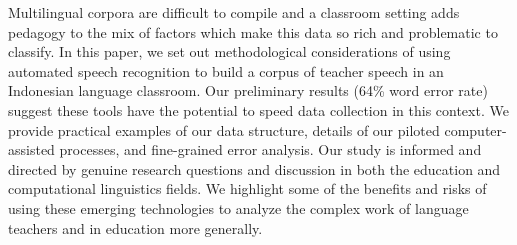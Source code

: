 Multilingual corpora are difficult to compile and a classroom setting adds pedagogy to the mix of factors which make this data so rich and problematic to classify. In this paper, we set out methodological considerations of using automated speech recognition to build a corpus of teacher speech in an Indonesian language classroom. Our preliminary results (64\% word error rate) suggest these tools have the potential to speed data collection in this context. We provide practical examples of our data structure, details of our piloted computer-assisted processes, and fine-grained error analysis. Our study is informed and directed by genuine research questions and discussion in both the education and computational linguistics fields. We highlight some of the benefits and risks of using these emerging technologies to analyze the complex work of language teachers and in education more generally.
